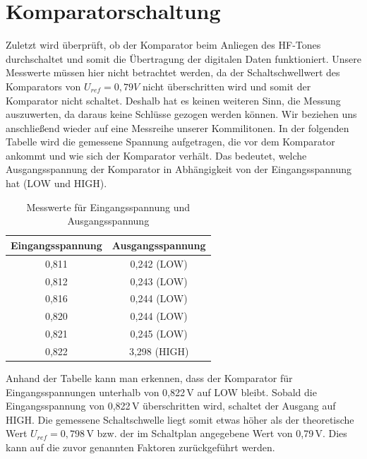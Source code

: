 \section{Komparatorschaltung} %
Zuletzt wird überprüft, ob der Komparator beim Anliegen des HF-Tones durchschaltet und somit die Übertragung der digitalen Daten funktioniert.
Unsere Messwerte müssen hier nicht betrachtet werden, da der Schaltschwellwert des Komparators von
$U_{ref}= 0,79V$ nicht überschritten wird und somit der Komparator nicht schaltet. Deshalb hat es keinen weiteren Sinn, die Messung auszuwerten, da daraus keine Schlüsse gezogen werden können.
Wir beziehen uns anschließend wieder auf eine Messreihe unserer Kommilitonen. In der folgenden Tabelle wird die gemessene Spannung
aufgetragen, die vor dem Komparator ankommt und wie sich der Komparator verhält. Das bedeutet, welche Ausgangsspannung
der Komparator in Abhängigkeit von der Eingangsspannung hat (LOW und HIGH).

\begin{table}[h]
\centering
\begin{tabular}{cc}
\textbf{Eingangsspannung} & \textbf{Ausgangsspannung} \\
\hline
0{,}811 & 0{,}242 (LOW) \\
0{,}812 & 0{,}243 (LOW) \\
0{,}816 & 0{,}244 (LOW) \\
0{,}820 & 0{,}244 (LOW) \\
0{,}821 & 0{,}245 (LOW) \\
0{,}822 & 3{,}298 (HIGH) \\
\end{tabular}
\caption{Messwerte für Eingangsspannung und Ausgangsspannung}
\end{table}

Anhand der Tabelle kann man erkennen, dass der Komparator für Eingangsspannungen unterhalb von 0{,}822\,V auf LOW bleibt. Sobald die Eingangsspannung von 0{,}822\,V überschritten wird, schaltet der Ausgang auf HIGH. Die gemessene Schaltschwelle liegt somit etwas höher als der theoretische Wert $U_{ref} = 0{,}798$\,V bzw. der im Schaltplan angegebene Wert von 0{,}79\,V. Dies kann auf die zuvor genannten Faktoren zurückgeführt werden.